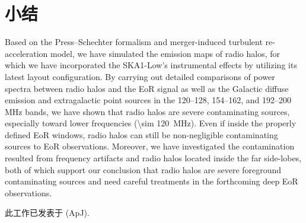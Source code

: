 \section{小结}

Based on the Press--Schechter formalism and merger-induced turbulent
re-acceleration model, we have simulated the emission maps of radio halos,
for which we have incorporated the SKA1-Low's instrumental effects by
utilizing its latest layout configuration.
By carrying out detailed comparisons of power spectra between radio halos
and the EoR signal as well as the Galactic diffuse emission and
extragalactic point sources in the \numrange{120}{128},
\numrange{154}{162}, and \numrange{192}{200} \si{\MHz} bands,
we have shown that radio halos are severe contaminating sources,
especially toward lower frequencies (\SI{\sim 120}{\MHz}).
Even if inside the properly defined EoR windows, radio halos can still
be non-negligible contaminating sources to EoR observations.
Moreover, we have investigated the contamination resulted from
frequency artifacts and radio halos located inside the far side-lobes,
both of which support our conclusion that radio halos are severe
foreground contaminating sources and need careful treatments in the
forthcoming deep EoR observations.

此工作已发表于 \apj{} (ApJ).


